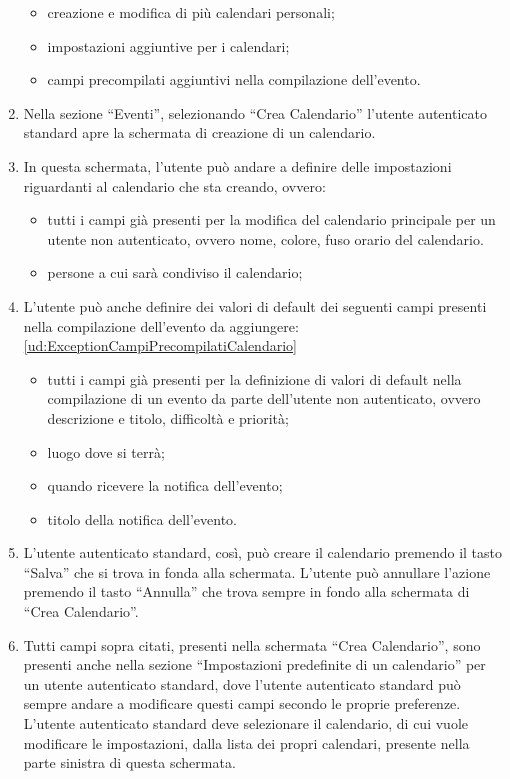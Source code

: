 \begin{listaPersonale}[UC]{}
\begin{enumerate}
              \begin{itemize}
                  \item creazione e modifica di più calendari personali;
                  \item impostazioni aggiuntive per i calendari;
                  \item campi precompilati aggiuntivi nella compilazione dell'evento.
              \end{itemize}
        \item Nella sezione “Eventi”, selezionando “Crea Calendario” l'utente autenticato standard apre la schermata di creazione di un calendario.
        \item In questa schermata, l'utente può andare a definire delle impostazioni riguardanti al calendario che sta creando, ovvero:
              \begin{itemize}
                  \item tutti i campi già presenti per la modifica del calendario principale per un utente non autenticato, ovvero nome, colore, fuso orario del calendario.
                  \item persone a cui sarà condiviso il calendario;
              \end{itemize}
        \item L'utente può anche definire dei valori di default dei seguenti campi presenti nella compilazione dell'evento da aggiungere: \ref{ud:ExceptionCampiPrecompilatiCalendario}
              \begin{itemize}
                  \item tutti i campi già presenti per la definizione di valori di default nella compilazione di un evento da parte dell'utente non autenticato, ovvero descrizione e titolo, difficoltà e priorità;
                  \item luogo dove si terrà;
                  \item quando ricevere la notifica dell'evento;
                  \item titolo della notifica dell'evento.
              \end{itemize}
        \item L'utente autenticato standard, così, può creare il calendario premendo il tasto “Salva” che si trova in fonda alla schermata. L'utente può annullare l'azione premendo il tasto “Annulla” che trova sempre in fondo alla schermata di “Crea Calendario”.
        \item Tutti campi sopra citati, presenti nella schermata “Crea Calendario”, sono presenti anche nella sezione “Impostazioni predefinite di un calendario” per un utente autenticato standard, dove l'utente autenticato standard può sempre andare a modificare questi campi secondo le proprie preferenze. L'utente autenticato standard deve selezionare il calendario, di cui vuole modificare le impostazioni, dalla lista dei propri calendari, presente nella parte sinistra di questa schermata.
    \end{enumerate}


\end{listaPersonale}
